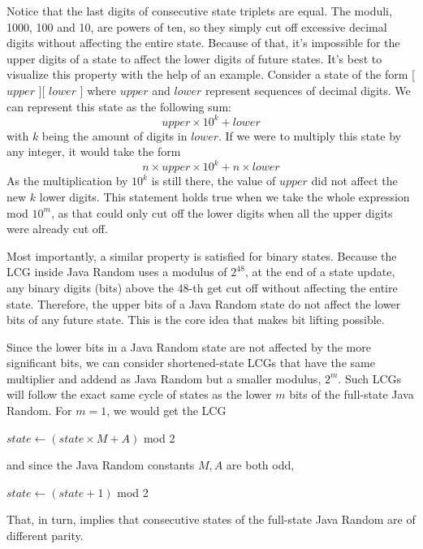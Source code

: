 \documentclass{article}
\begin{document}
Notice that the last digits of consecutive state triplets are equal. The moduli, 1000, 100 and 10, are powers of ten, so they simply cut off excessive decimal digits without affecting the entire state. Because of that, it’s impossible for the upper digits of a state to affect the lower digits of future states. It’s best to visualize this property with the help of an example. Consider a state of the form [ $upper$ ][ $lower$ ] where $upper$ and $lower$ represent sequences of decimal digits. We can represent this state as the following sum:
\begin{equation}
    upper \times 10^k + lower
\end{equation}
\noindent with $k$ being the amount of digits in $lower$. If we were to multiply this state by any integer, it would take the form
\begin{equation}
    n \times upper \times 10^k + n \times lower
\end{equation}
\noindent As the multiplication by $10^k$ is still there, the value of $upper$ did not affect the new $k$ lower digits. This statement holds true when we take the whole expression mod $10^m$, as that could only cut off the lower digits when all the upper digits were already cut off.

Most importantly, a similar property is satisfied for binary states. Because the LCG inside Java Random uses a modulus of $2^{48}$, at the end of a state update, any binary digits (bits) above the 48-th get cut off without affecting the entire state. Therefore, the upper bits of a Java Random state do not affect the lower bits of any future state. This is the core idea that makes bit lifting possible.

Since the lower bits in a Java Random state are not affected by the more significant bits, we can consider shortened-state LCGs that have the same multiplier and addend as Java Random but a smaller modulus, $2^m$. Such LCGs will follow the exact same cycle of states as the lower $m$ bits of the full-state Java Random. For $m = 1$, we would get the LCG
\begin{algorithmic}
    \State $state \gets (state \times M + A)$ mod 2
\end{algorithmic}
\noindent and since the Java Random constants $M, A$ are both odd,
\begin{algorithmic}
    \State $state \gets (state + 1)$ mod 2
\end{algorithmic}
\noindent That, in turn, implies that consecutive states of the full-state Java Random are of different parity.
\end{document}
